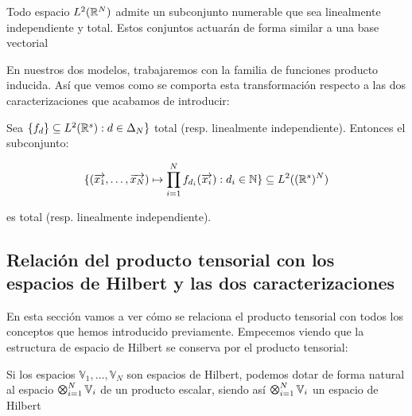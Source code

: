 \begin{proposicion}
    Todo espacio $L^2(\mathbb{R}^N)$ admite un subconjunto numerable que sea linealmente independiente y total. Estos conjuntos actuarán de forma similar a una base vectorial
\end{proposicion}

En nuestros dos modelos, trabajaremos con la familia de funciones producto inducida. Así que vemos como se comporta esta transformación respecto a las dos caracterizaciones que acabamos de introducir:

\begin{proposicion} \label{prop:conservacion_totalidad_indp_lineal_func_prod}
    Sea $\{f_d\} \subseteq L^2(\mathbb{R}^s): d \in \Delta_{N} \}$ total (resp. linealmente independiente). Entonces el subconjunto:

    \begin{equation}
        \{ (\overrightarrow{x_1}, \ldots, \overrightarrow{x_N}) \mapsto \prod_{i = 1}^N f_{d_i}(\overrightarrow{x_i}): d_i \in \mathbb{N} \} \subseteq L^2((\mathbb{R}^s)^N)
    \end{equation}

    es total (resp. linealmente independiente).
\end{proposicion}

\subsection{Relación del producto tensorial con los espacios de Hilbert y las dos caracterizaciones}

En esta sección vamos a ver cómo se relaciona el producto tensorial con todos los conceptos que hemos introducido previamente. Empecemos viendo que la estructura de espacio de Hilbert se conserva por el producto tensorial:

\begin{proposicion}

    Si los espacios $\mathbb{V}_1, \ldots, \mathbb{V}_N$ son espacios de Hilbert, podemos dotar de forma natural al espacio $\MediumOtimes_{i = 1}^N \mathbb{V}_i$ de un producto escalar, siendo así $\MediumOtimes_{i = 1}^N \mathbb{V}_i$ un espacio de Hilbert

\end{proposicion}

